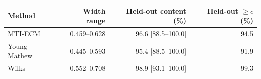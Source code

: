 \begin{tabular}{@{}lrrr@{}}
\toprule
Method & Width range & Held-out content (\%) & Held-out $\ge c$ (\%)\\
\midrule
MTI-ECM & 0.459--0.628 & 96.6 [88.5--100.0] & 94.5\\
Young--Mathew & 0.445--0.593 & 95.4 [88.5--100.0] & 91.9\\
Wilks & 0.552--0.708 & 98.9 [93.1--100.0] & 99.3\\
\bottomrule
\end{tabular}
